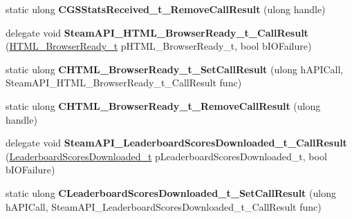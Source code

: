 \begin{DoxyCompactItemize}
static ulong {\bfseries C\+G\+S\+Stats\+Received\+\_\+t\+\_\+\+Remove\+Call\+Result} (ulong handle)
\item 
\mbox{\label{class_valve_1_1_interop_1_1_native_entrypoints_adb9f6db2148799ab3287efa8e48f95b3}} 
delegate void {\bfseries Steam\+A\+P\+I\+\_\+\+H\+T\+M\+L\+\_\+\+Browser\+Ready\+\_\+t\+\_\+\+Call\+Result} (\hyperlink{struct_valve_1_1_steamworks_1_1_h_t_m_l___browser_ready__t}{H\+T\+M\+L\+\_\+\+Browser\+Ready\+\_\+t} p\+H\+T\+M\+L\+\_\+\+Browser\+Ready\+\_\+t, bool b\+I\+O\+Failure)
\item 
\mbox{\label{class_valve_1_1_interop_1_1_native_entrypoints_a39a3a0c9f5f4bb9009e6e6e445167e4f}} 
static ulong {\bfseries C\+H\+T\+M\+L\+\_\+\+Browser\+Ready\+\_\+t\+\_\+\+Set\+Call\+Result} (ulong h\+A\+P\+I\+Call, Steam\+A\+P\+I\+\_\+\+H\+T\+M\+L\+\_\+\+Browser\+Ready\+\_\+t\+\_\+\+Call\+Result func)
\item 
\mbox{\label{class_valve_1_1_interop_1_1_native_entrypoints_af978465df9983500780618a999dd793a}} 
static ulong {\bfseries C\+H\+T\+M\+L\+\_\+\+Browser\+Ready\+\_\+t\+\_\+\+Remove\+Call\+Result} (ulong handle)
\item 
\mbox{\label{class_valve_1_1_interop_1_1_native_entrypoints_a61e4f757b2db935da5687814a90801e7}} 
delegate void {\bfseries Steam\+A\+P\+I\+\_\+\+Leaderboard\+Scores\+Downloaded\+\_\+t\+\_\+\+Call\+Result} (\hyperlink{struct_valve_1_1_steamworks_1_1_leaderboard_scores_downloaded__t}{Leaderboard\+Scores\+Downloaded\+\_\+t} p\+Leaderboard\+Scores\+Downloaded\+\_\+t, bool b\+I\+O\+Failure)
\item 
\mbox{\label{class_valve_1_1_interop_1_1_native_entrypoints_ad8569f236cb2d7092ea921995f1f90ab}} 
static ulong {\bfseries C\+Leaderboard\+Scores\+Downloaded\+\_\+t\+\_\+\+Set\+Call\+Result} (ulong h\+A\+P\+I\+Call, Steam\+A\+P\+I\+\_\+\+Leaderboard\+Scores\+Downloaded\+\_\+t\+\_\+\+Call\+Result func)
\item 
\mbox{\label{class_valve_1_1_interop_1_1_native_entrypoints_a4a830e582bda25120d9a3c126dd06b30}} 

\end{DoxyCompactItemize}
